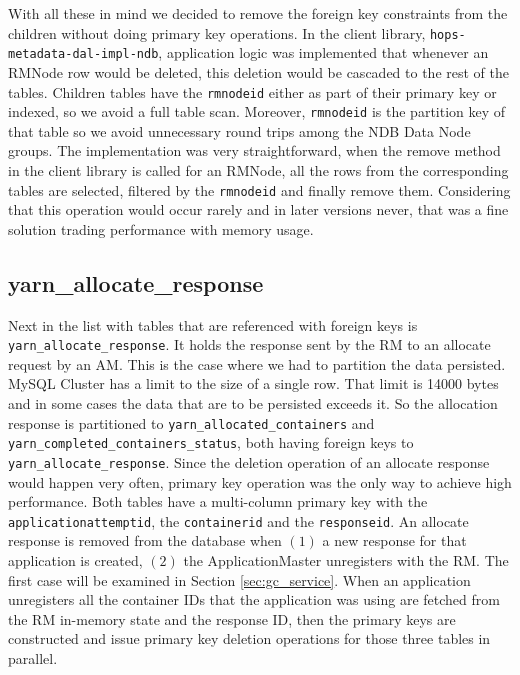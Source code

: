 With all these in mind we decided to remove the foreign key
constraints from the children without doing primary key
operations. In the client library, \texttt{hops-metadata-dal-impl-ndb},
application logic was implemented that whenever an RMNode row would be deleted, this
deletion would be cascaded to the rest of the tables. Children tables
have the \texttt{rmnodeid} either as part of their primary key or indexed, so we
avoid a full table scan. Moreover, \texttt{rmnodeid} is the partition
key of that table so we avoid unnecessary round trips among the NDB
Data Node groups. The implementation was very straightforward,
when the remove method in the client library is called for an RMNode,
all the rows from the corresponding tables are selected, filtered by the
\texttt{rmnodeid} and finally remove them. Considering that this
operation would occur rarely and in later versions never, that was a
fine solution trading performance with memory usage.

\subsection{yarn\_allocate\_response}
\label{ssec:impl_fk_alloc_resp}
Next in the list with tables that are referenced with foreign keys is
\texttt{yarn\_allocate\_response}. It holds the response sent by the
RM to an allocate request by an AM. This is the case where we had to
partition the data persisted. MySQL Cluster has a limit to the size of
a single row. That limit is 14000 bytes \cite{ndb_row_limit} and in
some cases the data that are to be persisted exceeds it. So the
allocation response is partitioned to
\texttt{yarn\_allocated\_containers} and
\texttt{yarn\_completed\_containers\_status}, both having foreign keys
to \texttt{yarn\_allocate\_response}. Since the deletion operation of
an allocate response would happen very often, primary key operation
was the only way to achieve high performance. Both tables have a
multi-column primary key with the \texttt{applicationattemptid}, the
\texttt{containerid} and the \texttt{responseid}. An allocate response
is removed from the database when $(1)$ a new response for that
application is created, $(2)$ the ApplicationMaster unregisters with
the RM. The first case will be examined in Section
\ref{sec:gc_service}. When an application unregisters all the
container IDs that the application was using are fetched from the RM in-memory
state and the response ID,
then the primary keys are constructed and issue primary key deletion
operations for those three tables in parallel.

